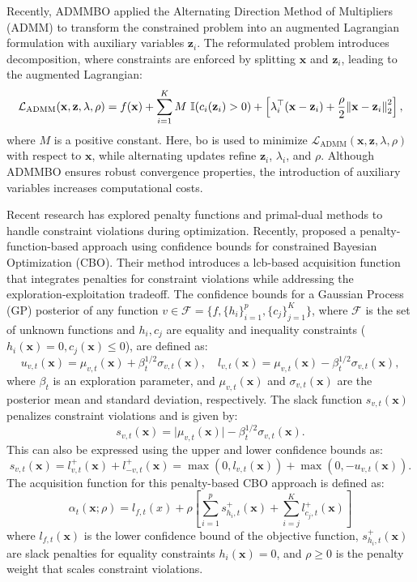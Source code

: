 Recently, ADMMBO \citep{ariafar2019admmbo} applied the Alternating Direction Method of Multipliers (ADMM) to transform the constrained problem into an augmented Lagrangian formulation with auxiliary variables \( \mathbf{z}_i \). The reformulated problem introduces decomposition, where constraints are enforced by splitting \( \mathbf{x} \) and \( \mathbf{z}_i \), leading to the augmented Lagrangian:  
\[
\mathcal{L}_{\text{ADMM}}(\mathbf{x}, \mathbf{z}, \lambda, \rho) = f(\mathbf{x})  + \sum_{i=1}^K M \text{ }   \mathbb{I}(c_i (\mathbf{z}_i) > 0) + \left[ \lambda_i^\top (\mathbf{x} - \mathbf{z}_i) + \frac{\rho}{2} \norm{\mathbf{x} - \mathbf{z}_i}_2^2 \right], 
\]
where $M$ is a positive constant. Here, \ac{bo} is used to minimize \( \mathcal{L}_{\text{ADMM}}(\mathbf{x}, \mathbf{z}, \lambda, \rho) \) with respect to \( \mathbf{x} \), while alternating updates refine \( \mathbf{z}_i \), \( \lambda_i \), and \( \rho \). Although ADMMBO ensures robust convergence properties, the introduction of auxiliary variables increases computational costs.

Recent research has explored penalty functions and primal-dual methods to handle constraint violations during optimization. Recently, \citet{lu2022no} proposed a penalty-function-based approach using confidence bounds for constrained Bayesian Optimization (CBO). Their method introduces a \ac{lcb}-based acquisition function that integrates penalties for constraint violations while addressing the exploration-exploitation tradeoff. The confidence bounds for a Gaussian Process (GP) posterior of any function \( v \in \mathcal{F} = \{f, \{h_i\}_{i=1}^p,  \{c_j\}_{j=1}^K\} \), where \( \mathcal{F} \) is the set of unknown functions and $h_i, c_j$ are equality and inequality constraints ($h_i(\mathbf{x}) = 0, c_j(\mathbf{x}) \le 0$), are defined as:  
\[
u_{v,t}(\mathbf{x}) = \mu_{v,t}(\mathbf{x}) + \beta_t^{1/2} \sigma_{v,t}(\mathbf{x}), \quad 
l_{v,t}(\mathbf{x}) = \mu_{v,t}(\mathbf{x}) - \beta_t^{1/2} \sigma_{v,t}(\mathbf{\mathbf{x}}),
\]
where \( \beta_t \) is an exploration parameter, and \( \mu_{v,t}(\mathbf{x}) \) and \( \sigma_{v,t}(\mathbf{x}) \) are the posterior mean and standard deviation, respectively. The slack function \( s_{v,t}(\mathbf{x}) \) penalizes constraint violations and is given by:  
\[
s_{v,t}(\mathbf{x}) = \lvert \mu_{v,t}(\mathbf{x}) \rvert - \beta_t^{1/2} \sigma_{v,t}(\mathbf{x}).
\]  
This can also be expressed using the upper and lower confidence bounds as:  
\[
s_{v,t}(\mathbf{x}) = l_{v,t}^+(\mathbf{x}) + l_{-v,t}^+(\mathbf{x}) = \max(0, l_{v,t}(\mathbf{x})) + \max(0, -u_{v,t}(\mathbf{x})).
\]  
The acquisition function for this penalty-based CBO approach is defined as:  
\[
\alpha_t(\mathbf{x}; \rho) = l_{f,t}(x) + \rho \left[ \sum_{i=1}^p s_{h_i,t}^+(\mathbf{x}) + \sum_{i=j}^K  l_{c_j,t}^+(\mathbf{x}) \right]
\] 
where \( l_{f,t}(\mathbf{x}) \) is the lower confidence bound of the objective function, \( s_{h_i,t}^+(\mathbf{x}) \) are slack penalties for equality constraints \( h_i(\mathbf{x}) = 0  \), and \( \rho \geq 0 \) is the penalty weight that scales constraint violations. 


